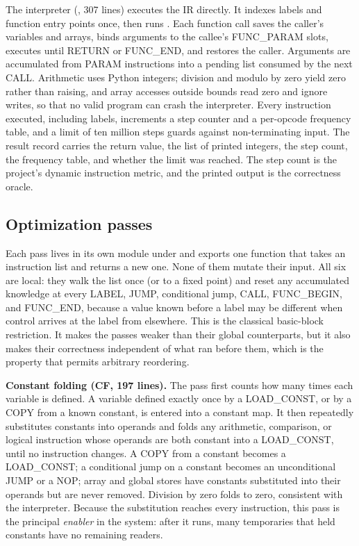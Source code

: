 The interpreter (, 307 lines) executes the IR directly. It indexes labels and function entry points once, then runs . Each function call saves the caller's variables and arrays, binds arguments to the callee's FUNC\_PARAM slots, executes until RETURN or FUNC\_END, and restores the caller. Arguments are accumulated from PARAM instructions into a pending list consumed by the next CALL. Arithmetic uses Python integers; division and modulo by zero yield zero rather than raising, and array accesses outside bounds read zero and ignore writes, so that no valid program can crash the interpreter. Every instruction executed, including labels, increments a step counter and a per-opcode frequency table, and a limit of ten million steps guards against non-terminating input. The result record carries the return value, the list of printed integers, the step count, the frequency table, and whether the limit was reached. The step count is the project's dynamic instruction metric, and the printed output is the correctness oracle.

\subsection{Optimization passes}

Each pass lives in its own module under  and exports one function that takes an instruction list and returns a new one. None of them mutate their input. All six are local: they walk the list once (or to a fixed point) and reset any accumulated knowledge at every LABEL, JUMP, conditional jump, CALL, FUNC\_BEGIN, and FUNC\_END, because a value known before a label may be different when control arrives at the label from elsewhere. This is the classical basic-block restriction. It makes the passes weaker than their global counterparts, but it also makes their correctness independent of what ran before them, which is the property that permits arbitrary reordering.

\textbf{Constant folding (CF, 197 lines).} The pass first counts how many times each variable is defined. A variable defined exactly once by a LOAD\_CONST, or by a COPY from a known constant, is entered into a constant map. It then repeatedly substitutes constants into operands and folds any arithmetic, comparison, or logical instruction whose operands are both constant into a LOAD\_CONST, until no instruction changes. A COPY from a constant becomes a LOAD\_CONST; a conditional jump on a constant becomes an unconditional JUMP or a NOP; array and global stores have constants substituted into their operands but are never removed. Division by zero folds to zero, consistent with the interpreter. Because the substitution reaches every instruction, this pass is the principal \emph{enabler} in the system: after it runs, many temporaries that held constants have no remaining readers.

